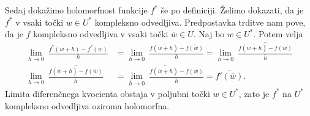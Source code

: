 \documentclass[mat1, tisk]{fmfdelo}
\begin{document}
\begin{dokaz}
        Sedaj dokažimo holomorfnost funkcije $f^*$ še po definiciji. Želimo dokazati, da je $f^*$ v vsaki točki $w \in U^*$ kompleksno odvedljiva. Predpostavka trditve nam pove, da je $f$ kompleksno odvedljiva v vsaki točki $\overline{w} \in U$.
        Naj bo $w \in U^*$. Potem velja
        \begin{align*}
            \lim_{h \to 0}{~\frac{f^*(w + h) - f^*(w)}{h}} &= \lim_{h \to 0}{~\frac{\overline{f\left(\overline{w + h}\right)} - \overline{f(\overline{w})}}{h}} = \lim_{h \to 0}{~\overline{\frac{f\left(\overline{w + h}\right) - f(\overline{w})}{\overline{h}}}} \\
            \lim_{h \to 0}{~\overline{\frac{f\left(\overline{w} + \overline{h}\right) - f(\overline{w})}{\overline{h}}}} & = \overline{\lim_{\overline{h} \to 0}{~\frac{f\left(\overline{w} + \overline{h}\right) - f(\overline{w})}{\overline{h}}}} = \overline{f'(\overline{w})}.
        \end{align*}
        Limita diferenčnega kvocienta obstaja v poljubni točki $w \in U^*$, zato je $f^*$ na $U^*$ kompleksno odvedljiva oziroma holomorfna.
    \end{dokaz}
\end{document}
